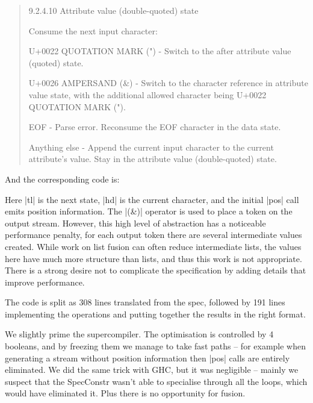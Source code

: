 \documentclass[draft]{sigplanconf}
\begin{document}
\begin{quote}
9.2.4.10 Attribute value (double-quoted) state

Consume the next input character:

U+0022 QUOTATION MARK (") - Switch to the after attribute value (quoted) state.

U+0026 AMPERSAND (\&) - Switch to the character reference in attribute value state, with the additional allowed character being U+0022 QUOTATION MARK (").

EOF - Parse error. Reconsume the EOF character in the data state.

Anything else - Append the current input character to the current attribute's value. Stay in the attribute value (double-quoted) state.
\end{quote}

And the corresponding code is:


Here |tl| is the next state, |hd| is the current character, and the initial |pos| call emits position information. The |(&)| operator is used to place a token on the output stream. However, this high level of abstraction has a noticeable performance penalty, for each output token there are several intermediate values created. While work on list fusion can often reduce intermediate lists, the values here have much more structure than lists, and thus this work is not appropriate. There is a strong desire not to complicate the specification by adding details that improve performance.

The code is split as 308 lines translated from the spec, followed by 191 lines implementing the operations and putting together the results in the right format.

We slightly prime the supercompiler. The optimisation is controlled by 4 booleans, and by freezing them we manage to take fast paths -- for example when generating a stream without position information then |pos| calls are entirely eliminated. We did the same trick with GHC, but it was negligible -- mainly we suspect that the SpecConstr wasn't able to specialise through all the loops, which would have eliminated it. Plus there is no opportunity for fusion.
\end{document}
